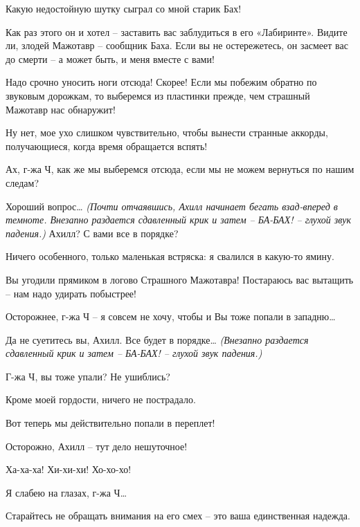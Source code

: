 \documentclass[../main.tex]{subfiles}
\begin{document}
\begin{Dialogue}
\begin{sublevel}
\begin{sublevel}
\begin{sublevel}
 Какую недостойную шутку сыграл со мной старик Бах!

 Как раз этого он и хотел \--- заставить вас заблудиться в его «Лабиринте». Видите ли, злодей Мажотавр \--- сообщник Баха. Если вы не остережетесь, он засмеет вас до смерти \--- а может быть, и меня вместе с вами!

 Надо срочно уносить ноги отсюда! Скорее! Если мы побежим обратно по звуковым дорожкам, то выберемся из пластинки прежде, чем страшный Мажотавр нас обнаружит!

 Ну нет, мое ухо слишком чувствительно, чтобы вынести странные аккорды, получающиеся, когда время обращается вспять!

 Ах, г-жа Ч, как же мы выберемся отсюда, если мы не можем вернуться по нашим следам?

 Хороший вопрос\ldots{} \emph{(Почти отчаявшись, Ахилл начинает бегать взад-вперед в темноте. Внезапно раздается сдавленный крик и затем \--- БА-БАХ! \--- глухой звук падения.)} Ахилл? С вами все в порядке?

 Ничего особенного, только маленькая встряска: я свалился в какую-то ямину.

 Вы угодили прямиком в логово Страшного Мажотавра! Постараюсь вас вытащить \--- нам надо удирать побыстрее!

 Осторожнее, г-жа Ч \--- я совсем не хочу, чтобы и Вы тоже попали в западню\ldots{}

 Да не суетитесь вы, Ахилл. Все будет в порядке\ldots{} \emph{(Внезапно раздается сдавленный крик и затем \--- БА-БАХ! \--- глухой звук падения.)}

 Г-жа Ч, вы тоже упали? Не ушиблись?

 Кроме моей гордости, ничего не пострадало.

 Вот теперь мы действительно попали в переплет!


 Осторожно, Ахилл \--- тут дело нешуточное!

 Ха-ха-ха! Хи-хи-хи! Хо-хо-хо!

 Я слабею на глазах, г-жа Ч\ldots{}

 Старайтесь не обращать внимания на его смех \--- это ваша единственная надежда.


\end{sublevel}
\end{sublevel}
\end{sublevel}
\end{Dialogue}
\end{document}
